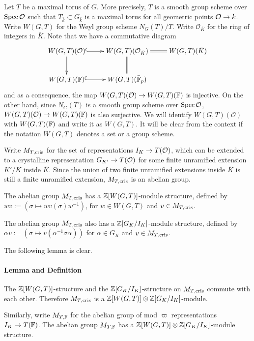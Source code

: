 \documentclass[10pt,a4paper,twoside]{article}
\begin{document}
\subsection{}
Let $T$ be a maximal torus of $G$. More precisely, $T$ is a smooth group scheme over $\operatorname{Spec} \mathcal{O}$ such that $T_{\bar k}\subset G_{\bar k}$ is a maximal torus for all geometric points $\mathcal{O} \to \bar k$.
Write
$W(G, T)$ for the Weyl group scheme $N_G(T)/T$.
Write $\mathcal{O}_{\bar K}$ for the ring of integers in $\bar K$.
Note that we have a commutative diagram
$$
\xymatrix{
    W(G, T)(\mathcal{O})
    \ar@{^{(}->}[r] \ar[d] &
    W(G, T)(\mathcal{O}_{\bar K})\ar@{=}[d] \ar@{=}[r] & W(G, T)({\bar K}) \\
    W(G, T)(\bF)
    \ar@{^{(}->}[r] &
    W(G, T)(\bFp) \\
}
$$
and as a consequence, the map
$W(G, T)(\mathcal{O}) \to W(G, T)({\mathbb{F}})$ is injective.
On the other hand, since $N_G(T)$ is a smooth group scheme over $\operatorname{Spec} \mathcal{O}$, 
$W(G, T)(\mathcal{O}) \to W(G, T)({\mathbb{F}})$ is also surjective.
We will identify $W(G, T)(\mathcal{O})$ with $W(G, T)({\mathbb{F}})$
and write it as $W(G, T)$.
It will be clear from the context if the notation $W(G, T)$ denotes a set or a group scheme.

Write $M_{T,\operatorname{cris}}$ for the set of representations $I_K \to T(\mathcal{O})$,
which can be extended to a crystalline representation $G_{K'}\to T(\mathcal{O})$
for some finite unramified extension $K'/K$ inside $\bar K$.
Since the union of two finite unramified extensions inside $\bar K$ is still a finite unramified extension,
$M_{T,\operatorname{cris}}$ is an abelian group.

The abelian group $M_{T,\operatorname{cris}}$ has a ${\mathbb{Z}}[W(G,T)]$-module structure, defined by
$w v := (\sigma \mapsto w v(\sigma) w^{-1})$,
for $w\in W(G,T)$ and $v \in M_{T,\operatorname{cris}}$.

The abelian group $M_{T,\operatorname{cris}}$ also has a ${\mathbb{Z}}[G_K/I_K]$-module structure, defined by
$\alpha v := (\sigma \mapsto v(\alpha^{-1} \sigma \alpha))$
for $\alpha\in G_K$ and $v \in M_{T,\operatorname{cris}}$.

The following lemma is clear.

\paragraph{\bf Lemma and Definition}
The ${\mathbb{Z}}[W(G,T)]$-structure and the ${\mathbb{Z}}[G_K/I_K]$-structure
on $M_{T,\operatorname{cris}}$ commute with each other.
Therefore $M_{T,\operatorname{cris}}$ is a ${\mathbb{Z}}[W(G,T)] \otimes {\mathbb{Z}}[G_K/I_K]$-module.

Similarly,
write $M_{T,{\mathbb{F}}}$ for the abelian group of mod $\varpi$ representations $I_K \to T({\mathbb{F}})$.
The abelian group $M_{T, {\mathbb{F}}}$ has a ${\mathbb{Z}}[W(G,T)] \otimes {\mathbb{Z}}[G_K/I_K]$-module structure.
\end{document}
